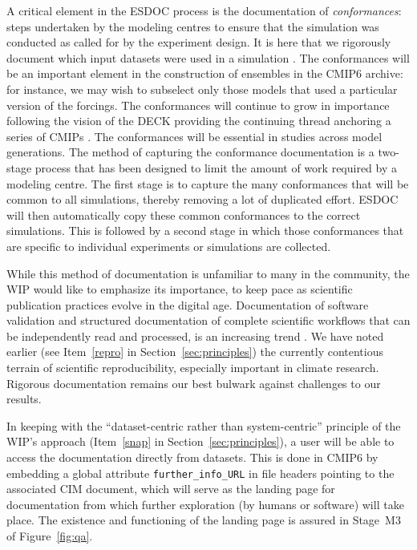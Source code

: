 \documentclass[gmd,manuscript]{copernicus}
\newcommand{\figref}[1] {\mbox{Figure   \ref{fig:#1}}}
\newcommand{\secref}[1] {\mbox{Section  \ref{sec:#1}}}
\begin{document}
A critical element in the ESDOC process is the documentation of
\emph{conformances}: steps undertaken by the modeling centres to
ensure that the simulation was conducted as called for by the
experiment design. It is here that we rigorously document which input
datasets were used in a simulation \citep[e.g the version of each of
the forcing datasets, see][]{ref:duracketal2017}. The conformances
will be an important element in the construction of ensembles in the
CMIP6 archive: for instance, we may wish to subselect only those
models that used a particular version of the forcings. The
conformances will continue to grow in importance following the vision
of the DECK providing the continuing thread anchoring a series of
CMIPs \citep[viz. the well-known Figure~1 of][]{ref:eyringetal2016a}.
The conformances will be essential in studies across model
generations. The method of capturing the conformance documentation is
a two-stage process that has been designed to limit the amount of work
required by a modeling centre. The first stage is to capture the many
conformances that will be common to all simulations, thereby removing
a lot of duplicated effort. ESDOC will then automatically copy these
common conformances to the correct simulations. This is followed by a
second stage in which those conformances that are specific to
individual experiments or simulations are collected.

While this method of documentation is unfamiliar to many in the
community, the WIP would like to emphasize its importance, to keep
pace as scientific publication practices evolve in the digital age.
Documentation of software validation \citep[see e.g][]{ref:peng2011}
and structured documentation of complete scientific workflows that can
be independently read and processed, is an increasing trend \citep[see
the special issue on the ``Geoscience Paper of the Future'',
][]{ref:davidetal2016}. We have noted earlier (see Item~\ref{repro} in
\secref{principles}) the currently contentious terrain of scientific
reproducibility, especially important in climate research. Rigorous
documentation remains our best bulwark against challenges to our results.

In keeping with the ``dataset-centric rather than system-centric''
principle of the WIP's approach (Item~\ref{snap} in
\secref{principles}), a user will be able to access the documentation
directly from datasets. This is done in CMIP6 by embedding a global
attribute \texttt{further\_info\_URL} in file headers pointing to the
associated CIM document, which will serve as the landing page for
documentation from which further exploration (by humans or software)
will take place. The existence and functioning of the landing page is
assured in Stage~M3 of \figref{qa}.
\end{document}
